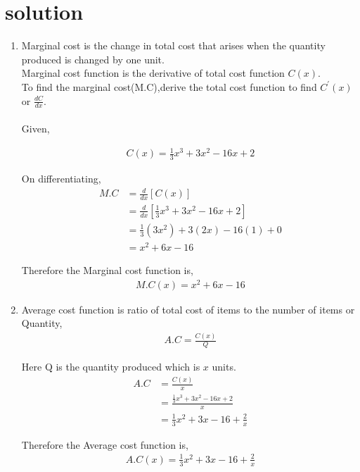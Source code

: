 \documentclass[article,12pt,twocolumn]{IEEEtran}
\begin{document}
  \section*{solution}
     \begin{enumerate}[ label=(\roman*)]
    \item Marginal cost is the change in total cost that arises when the quantity produced is changed by one unit. \\
          Marginal cost function is the derivative of total cost function $C(x)$.\\
          To find the marginal cost(M.C),derive the total cost function to find $C^{\prime}(x)$ or $\frac{dC}{dx}$. \\\\
      Given,
      
          \begin{align}
            C(x) = \frac{1}{3}x^3 + 3x^2 - 16x +2
          \end{align}
          
      On differentiating,
          \begin{align}
            M.C &= \frac{d}{dx} [C(x)]
            \\
            &= \frac{d}{dx} [\frac{1}{3}x^3 + 3x^2 - 16x +2] 
            \\
            &= \frac{1}{3}(3x^2) + 3(2x)-16(1)+0 
            \\
            &= x^2+6x-16
          \end{align}  
          
      Therefore the Marginal cost function is,
          \begin{align*}
            M.C(x)=x^2+6x-16
          \end{align*}        
      
    \item Average cost function is ratio of total cost of items to the number of items or Quantity,
         \begin{align}
           A.C=\frac{C(x)}{Q}
         \end{align}
         
    Here Q is the quantity produced which is $x$ units.
        \begin{align}
          A.C &=\frac{C(x)}{x} 
          \\
          &=\frac{\frac{1}{3}x^3 + 3x^2 - 16x +2}{x} 
          \\
          &=\frac{1}{3}x^2 + 3x - 16 +\frac{2}{x}
        \end{align}    
               
    Therefore the Average cost function is,
         \begin{align*}
           A.C(x)=\frac{1}{3}x^2 + 3x - 16 +\frac{2}{x}
         \end{align*}
         
   \end{enumerate}
   
\end{document}
